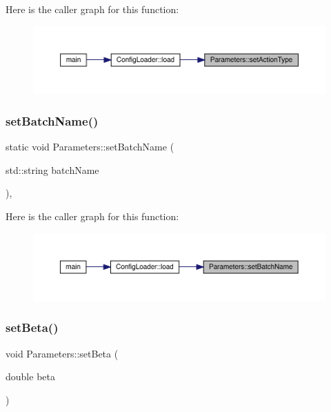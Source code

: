 Here is the caller graph for this function\+:\nopagebreak
\begin{figure}[H]
\begin{center}
\leavevmode
\includegraphics[width=350pt]{class_parameters_aa7436b658d07358009b922584798fb6d_icgraph}
\end{center}
\end{figure}
\mbox{\label{class_parameters_a8e349761195db7184f309e0f074da84d}} 
\subsubsection{\texorpdfstring{setBatchName()}{setBatchName()}}
{\footnotesize\ttfamily static void Parameters\+::set\+Batch\+Name (\begin{DoxyParamCaption}\item[{std\+::string}]{batch\+Name }\end{DoxyParamCaption})\hspace{0.3cm}{\ttfamily [inline]}, {\ttfamily [static]}}

Here is the caller graph for this function\+:\nopagebreak
\begin{figure}[H]
\begin{center}
\leavevmode
\includegraphics[width=350pt]{class_parameters_a8e349761195db7184f309e0f074da84d_icgraph}
\end{center}
\end{figure}
\mbox{\label{class_parameters_a8462149cb29ecf936f1f9945f5de4908}} 
\subsubsection{\texorpdfstring{setBeta()}{setBeta()}}
{\footnotesize\ttfamily void Parameters\+::set\+Beta (\begin{DoxyParamCaption}\item[{double}]{beta }\end{DoxyParamCaption})\hspace{0.3cm}{\ttfamily [static]}}

